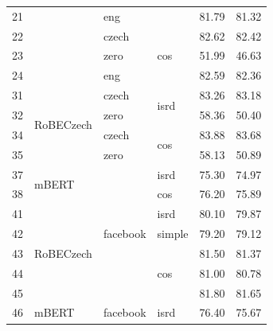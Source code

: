 \begin{table}[]
{\begin{tabular}{|l|l|l|l||ll|}
21 &                            & eng                       &                       & 81.79   & 81.32 \\ \cline{1-1} \cline{3-6}
22 &                            & czech                     & \multirow{3}{*}{cos}  & 82.62   & 82.42 \\ \cline{1-1} \cline{3-3} \cline{5-6}
23 &                            & zero                      &                       & 51.99   & 46.63 \\ \cline{1-1} \cline{3-3} \cline{5-6}
24 &                            & eng                       &                       & 82.59   & 82.36 \\ \hline
31 & \multirow{4}{*}{RoBECzech} & czech                     & \multirow{2}{*}{isrd} & 83.26   & 83.18 \\ \cline{1-1} \cline{3-3} \cline{5-6}
32 &                            & zero                      &                       & 58.36   & 50.40 \\ \cline{1-1} \cline{3-6}
34 &                            & czech                     & \multirow{2}{*}{cos}  & 83.88   & 83.68 \\ \cline{1-1} \cline{3-3} \cline{5-6}
35 &                            & zero                      &                       & 58.13   & 50.89 \\ \hline
37 & \multirow{2}{*}{mBERT}     & \multirow{7}{*}{facebook} & isrd                  & 75.30   & 74.97 \\ \cline{1-1} \cline{4-6}
38 &                            &                           & cos                   & 76.20   & 75.89 \\ \cline{1-2} \cline{4-6}
41 & \multirow{5}{*}{RoBECzech} &                           & isrd                  & 80.10   & 79.87 \\ \cline{1-1} \cline{4-6}
42 &                            &                           & simple                & 79.20   & 79.12 \\ \cline{1-1} \cline{4-6}
43 &                            &                           & \multirow{3}{*}{cos}  & 81.50   & 81.37 \\ \cline{1-1} \cline{5-6}
44 &                            &                           &                       & 81.00   & 80.78 \\ \cline{1-1} \cline{5-6}
45 &                            &                           &                       & 81.80   & 81.65 \\ \hline
46 & \multirow{2}{*}{mBERT}     & \multirow{4}{*}{facebook} & isrd                  & 76.40   & 75.67 \\ \cline{1-1} \cline{4-6}

\end{tabular}}
\end{table}

